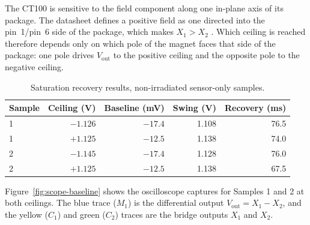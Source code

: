 \documentclass[12pt,a4paper]{article}
\begin{document}
The CT100 is sensitive to the field component along one in-plane axis of its package. The datasheet defines a positive field as one directed into the pin~1/pin~6 side of the package, which makes $X_1 > X_2$ \cite{ct100_datasheet}. Which ceiling is reached therefore depends only on which pole of the magnet faces that side of the package: one pole drives $V_{\text{out}}$ to the positive ceiling and the opposite pole to the negative ceiling.


\begin{table}[H]
\centering
\caption{Saturation recovery results, non-irradiated sensor-only samples.}
\label{tab:sat-nonirr-sensoronly}
\begin{tabular}{@{}lrrrr@{}}
\toprule
Sample & Ceiling (V) & Baseline (mV) & Swing (V) & Recovery (ms) \\
\midrule
1 & $-1.126$ & $-17.4$ & 1.108 & 76.5 \\
1 & $+1.125$ & $-12.5$ & 1.138 & 74.0 \\
2 & $-1.145$ & $-17.4$ & 1.128 & 76.0 \\
2 & $+1.125$ & $-12.5$ & 1.138 & 67.5 \\
\bottomrule
\end{tabular}
\end{table}


Figure~\ref{fig:scope-baseline} shows the oscilloscope captures for Samples 1 and 2 at both ceilings. The blue trace ($M_1$) is the differential output $V_{\text{out}} = X_1 - X_2$, and the yellow ($C_1$) and green ($C_2$) traces are the bridge outputs $X_1$ and $X_2$.
\end{document}

